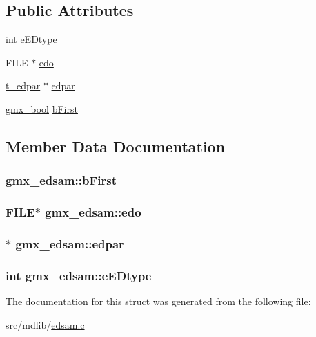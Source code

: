 \subsection*{\-Public \-Attributes}
\begin{DoxyCompactItemize}
\item 
int \hyperlink{structgmx__edsam_a047de0edebc19e54a7b014c3bd828edb}{e\-E\-Dtype}
\item 
\-F\-I\-L\-E $\ast$ \hyperlink{structgmx__edsam_a9e72e5d61eb202cfad57976aa395a328}{edo}
\item 
\hyperlink{edsam_8c_ac7fb4c0944c14a7c1bbdb1f0420a40dc}{t\-\_\-edpar} $\ast$ \hyperlink{structgmx__edsam_acb5c932b08c2b3c0d32d0e28d98c1cf6}{edpar}
\item 
\hyperlink{include_2types_2simple_8h_a8fddad319f226e856400d190198d5151}{gmx\-\_\-bool} \hyperlink{structgmx__edsam_ab8c0e06984a6ff2e9c981c275ee392d9}{b\-First}
\end{DoxyCompactItemize}


\subsection{\-Member \-Data \-Documentation}
\hypertarget{structgmx__edsam_ab8c0e06984a6ff2e9c981c275ee392d9}{
\subsubsection[{b\-First}]{ {\bf gmx\-\_\-edsam\-::b\-First}}}\label{structgmx__edsam_ab8c0e06984a6ff2e9c981c275ee392d9}
\hypertarget{structgmx__edsam_a9e72e5d61eb202cfad57976aa395a328}{
\subsubsection[{edo}]{\setlength{\rightskip}{0pt plus 5cm}\-F\-I\-L\-E$\ast$ {\bf gmx\-\_\-edsam\-::edo}}}\label{structgmx__edsam_a9e72e5d61eb202cfad57976aa395a328}
\hypertarget{structgmx__edsam_acb5c932b08c2b3c0d32d0e28d98c1cf6}{
\subsubsection[{edpar}]{$\ast$ {\bf gmx\-\_\-edsam\-::edpar}}}\label{structgmx__edsam_acb5c932b08c2b3c0d32d0e28d98c1cf6}
\hypertarget{structgmx__edsam_a047de0edebc19e54a7b014c3bd828edb}{
\subsubsection[{e\-E\-Dtype}]{\setlength{\rightskip}{0pt plus 5cm}int {\bf gmx\-\_\-edsam\-::e\-E\-Dtype}}}\label{structgmx__edsam_a047de0edebc19e54a7b014c3bd828edb}


\-The documentation for this struct was generated from the following file\-:\begin{DoxyCompactItemize}
\item 
src/mdlib/\hyperlink{edsam_8c}{edsam.\-c}\end{DoxyCompactItemize}
